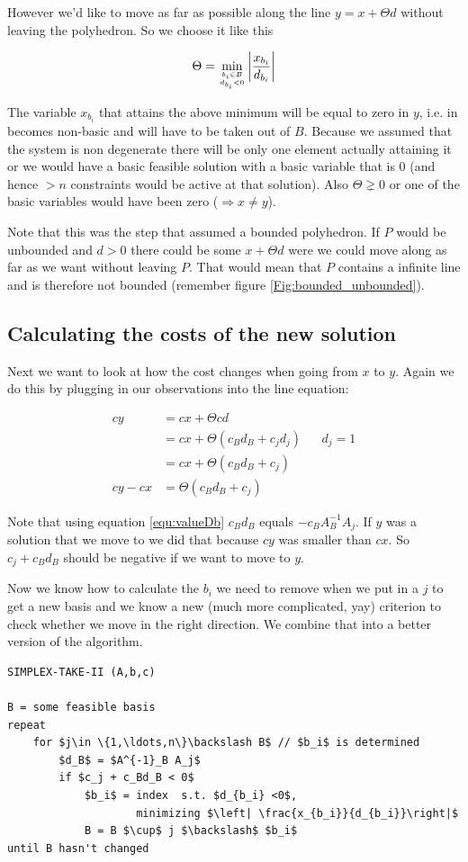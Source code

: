However we'd like to move as far as possible along the line $y=x+\Theta d$ without leaving the polyhedron. So we choose it like this

\[\Theta = \min_{{b_i\in B}\atop {d_{b_i} <0}} \left| \frac{x_{b_i}}{d_{b_i}}\right |\]

The variable $x_{b_i}$ that attains the above minimum will be equal to zero in $y$, i.e. in becomes non-basic and will have to be taken out of $B$. Because we assumed that the system is non degenerate there will be only one element actually attaining it or we would have a basic feasible solution with a basic variable that is 0 (and hence $>n$ constraints would be active at that solution). Also $\Theta \gneq 0$ or one of the basic variables would have been zero ($\Rightarrow x\neq y$).

Note that this was the step that assumed a bounded polyhedron. If $P$ would be unbounded and $d>0$ there could be some $x+\Theta d$ were we could move along as far as we want without leaving $P$. That would mean that $P$ contains a infinite line and is therefore not bounded (remember figure \ref{Fig:bounded_unbounded}).

\subsection{Calculating the costs of the new solution}
Next we want to look at how the cost changes when going from $x$ to $y$. Again we do this by plugging in our observations into the line equation:

\begin{align*}
cy &= cx + \Theta cd\\
    &= cx + \Theta (c_Bd_B + c_jd_j) &&d_j=1\\
    &= cx + \Theta (c_Bd_B + c_j)\\
cy - cx &= \Theta (c_Bd_B +c_j)
\end{align*}

Note that using equation \ref{equ:valueDb} $c_Bd_B$ equals $- c_B A^{-1}_B A_j$.
If $y$ was a solution that we move to we did that because $cy$ was smaller than $cx$. So $c_j + c_Bd_B$ should be negative if we want to move to $y$. 

Now we know how to calculate the $b_i$ we need to remove when we put in a $j$ to get a new basis and we know a new (much more complicated, yay) criterion to check whether we move in the right direction. We combine that into a better version of the algorithm.

\begin{center}
\begin{lstlisting}
SIMPLEX-TAKE-II (A,b,c)

B = some feasible basis
repeat 
    for $j\in \{1,\ldots,n\}\backslash B$ // $b_i$ is determined
        $d_B$ = $A^{-1}_B A_j$
        if $c_j + c_Bd_B < 0$
            $b_i$ = index  s.t. $d_{b_i} <0$, 
                    minimizing $\left| \frac{x_{b_i}}{d_{b_i}}\right|$
            B = B $\cup$ j $\backslash$ $b_i$
until B hasn't changed
\end{lstlisting}
\end{center}

